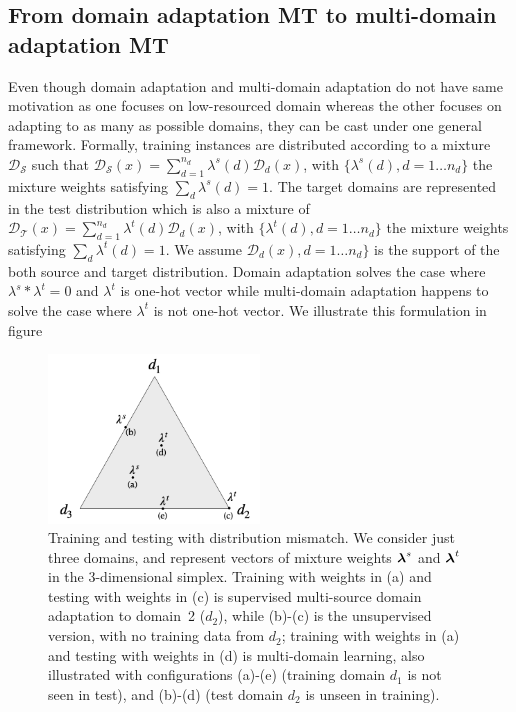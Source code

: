 \subsection{From domain adaptation MT to multi-domain adaptation MT}
Even though domain adaptation and multi-domain adaptation do not have same motivation as one focuses on low-resourced domain whereas the other focuses on adapting to as many as possible domains, they can be cast under one general framework. Formally, training instances are distributed according to a mixture $\mathcal{D_S}$ such that $\mathcal{D_S}(x) = \sum_{d=1}^{n_d} \lambda^{s}(d) \mathcal{D}_d(x)$, with $\{\lambda^{s}(d), d=1 \dots n_d\}$ the mixture weights satisfying $\sum_d \lambda^{s}(d)=1$. The target domains are represented in the test distribution which is also a mixture of $\mathcal{D_T}(x) = \sum_{d=1}^{n_d} \lambda^{t}(d) \mathcal{D}_d(x)$, with $\{\lambda^{t}(d), d=1 \dots n_d\}$ the mixture weights satisfying $\sum_d \lambda^{t}(d)=1$. We assume $\mathcal{D}_d(x), d=1 \dots n_d\}$ is the support of the both source and target distribution. Domain adaptation solves the case where $\lambda^s * \lambda^t = 0$ and $\lambda^t$ is one-hot vector while multi-domain adaptation happens to solve the case where $\lambda^t$ is not one-hot vector. We illustrate this formulation in figure %
\begin{figure}[h]
  \centering
  \includegraphics[width=0.5\textwidth]{graphics/mdmt-lambdas}
  \caption[Training and testing with distribution mismatch]{Training and testing with distribution mismatch. We consider just three domains, and represent vectors of mixture weights $\boldsymbol\lambda^{s}$ and $\boldsymbol\lambda^{t}$ in the 3-dimensional simplex. Training with weights in (a) and testing with weights in (c) is supervised multi-source domain adaptation to domain~2 ($d_2$), while (b)-(c) is the unsupervised version, with no training data from $d_2$; training with weights in (a) and testing with weights in (d) is multi-domain learning, also illustrated with configurations (a)-(e) (training domain $d_1$ is not seen in test), and (b)-(d)  (test domain $d_2$ is unseen in training).}
  \label{fig:mdmt-lambdas}
\end{figure}

